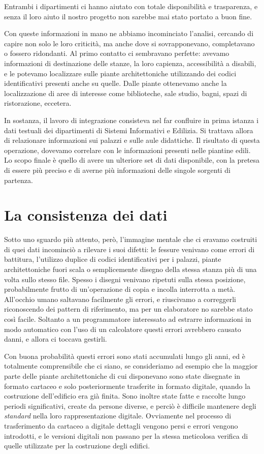 \documentclass[12pt]{report}
\begin{document}
Entrambi i dipartimenti ci hanno aiutato con totale disponibilità e trasparenza, e senza il loro aiuto il nostro progetto non sarebbe mai stato portato a buon fine.

Con queste informazioni in mano ne abbiamo incominciato l'analisi, cercando di capire non solo le loro criticità, ma anche dove si sovrapponevano, completavano o fossero ridondanti. Al primo contatto ci sembravano perfette: avevamo informazioni di destinazione delle stanze, la loro capienza, accessibilità a disabili, e le potevamo localizzare sulle piante architettoniche utilizzando dei codici identificativi presenti anche su quelle. Dalle piante ottenevamo anche la localizzazione di aree di interesse come biblioteche, sale studio, bagni, spazi di ristorazione, eccetera.

In sostanza, il lavoro di integrazione consisteva nel far confluire in prima istanza i dati testuali dei dipartimenti di Sistemi Informativi e Edilizia. Si trattava allora di relazionare informazioni sui palazzi e sulle aule didattiche. Il risultato di questa operazione, dovevamo correlare con le informazioni presenti nelle piantine edili. Lo scopo finale è quello di avere un ulteriore set di dati disponibile, con la pretesa di essere più preciso e di averne più informazioni delle singole sorgenti di partenza.

\section{La consistenza dei dati}

Sotto uno sguardo più attento, però, l'immagine mentale che ci eravamo costruiti di quei dati incominciò a rilevare i suoi difetti: le fessure venivano come errori di battitura, l'utilizzo duplice di codici identificativi per i palazzi, piante architettoniche fuori scala o semplicemente disegno della stessa stanza più di una volta sullo stesso file. Spesso i disegni venivano ripetuti sulla stessa posizione, probabilmente frutto di un'operazione di copia e incolla interrotta a metà. All'occhio umano saltavano facilmente gli errori, e riuscivamo a correggerli riconoscendo dei pattern di riferimento, ma per un elaboratore no sarebbe stato così facile. Soltanto a un programmatore interessato ad estrarre informazioni in modo automatico con l'uso di un calcolatore questi errori avrebbero causato danni, e allora ci toccava gestirli.

Con buona probabilità questi errori sono stati accumulati lungo gli anni, ed è totalmente comprensibile che ci siano, se  consideriamo ad esempio che la maggior parte delle piante architettoniche di cui disponevano sono state disegnate in formato cartaceo e solo posteriormente trasferite in formato digitale, quando la costruzione dell'edificio era già finita. Sono inoltre state fatte e raccolte lungo periodi significativi, create da persone diverse, e perciò è difficile mantenere degli \textit{standard} nella loro rappresentazione digitale. Ovviamente nel processo di trasferimento da cartaceo a digitale dettagli vengono persi e errori vengono introdotti, e le versioni digitali non passano per la stessa meticolosa verifica di quelle utilizzate per la costruzione degli edifici. 
\end{document}
